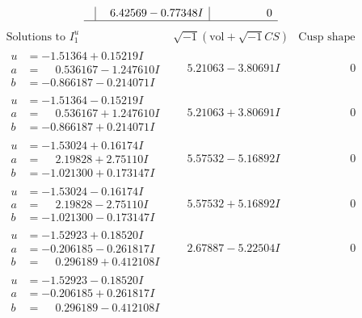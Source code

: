 \documentclass[1p]{elsarticle_modified}
\theoremstyle{definition}
\newcommand{\I}{\sqrt{-1}}
\begin{document}
$$\begin{array}{c|c|c}
 & \phantom{-}6.42569 - 0.77348 I & \phantom{-0.000000 } 0\\
 \hline 
 \end{array}$$\newpage$$\begin{array}{c|c|c}  
\text{Solutions to }I^u_{1}& \I (\text{vol} + \sqrt{-1}CS) & \text{Cusp shape}\\
 \hline 
\begin{aligned}
u &= -1.51364 + 0.15219 I \\
a &= \phantom{-}0.536167 - 1.247610 I \\
b &= -0.866187 - 0.214071 I\end{aligned}
 & \phantom{-}5.21063 - 3.80691 I & \phantom{-0.000000 } 0 \\ \hline\begin{aligned}
u &= -1.51364 - 0.15219 I \\
a &= \phantom{-}0.536167 + 1.247610 I \\
b &= -0.866187 + 0.214071 I\end{aligned}
 & \phantom{-}5.21063 + 3.80691 I & \phantom{-0.000000 } 0 \\ \hline\begin{aligned}
u &= -1.53024 + 0.16174 I \\
a &= \phantom{-}2.19828 + 2.75110 I \\
b &= -1.021300 + 0.173147 I\end{aligned}
 & \phantom{-}5.57532 - 5.16892 I & \phantom{-0.000000 } 0 \\ \hline\begin{aligned}
u &= -1.53024 - 0.16174 I \\
a &= \phantom{-}2.19828 - 2.75110 I \\
b &= -1.021300 - 0.173147 I\end{aligned}
 & \phantom{-}5.57532 + 5.16892 I & \phantom{-0.000000 } 0 \\ \hline\begin{aligned}
u &= -1.52923 + 0.18520 I \\
a &= -0.206185 - 0.261817 I \\
b &= \phantom{-}0.296189 + 0.412108 I\end{aligned}
 & \phantom{-}2.67887 - 5.22504 I & \phantom{-0.000000 } 0 \\ \hline\begin{aligned}
u &= -1.52923 - 0.18520 I \\
a &= -0.206185 + 0.261817 I \\
b &= \phantom{-}0.296189 - 0.412108 I\end{aligned}

\end{array}$$
\end{document}
